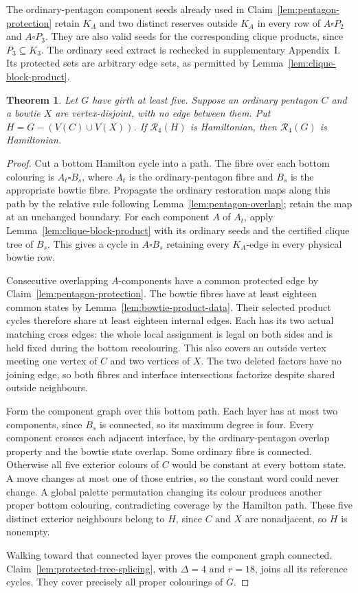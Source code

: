 \documentclass[11pt]{article}
\newtheorem{theorem}{Theorem}[section]
\theoremstyle{remark}
\newcommand{\R}{\mathcal R}
\numberwithin{equation}{section}
\numberwithin{table}{section}
\begin{document}
The ordinary-pentagon component seeds already used in
Claim~\ref{lem:pentagon-protection} retain $K_A$ and two distinct
reserves outside $K_A$ in every row of $A\square P_2$ and
$A\square P_3$. They are also valid seeds for the corresponding
clique products, since $P_3\subseteq K_3$. The ordinary seed extract
is rechecked in supplementary Appendix~I. Its protected sets are
arbitrary edge sets, as permitted by Lemma~\ref{lem:clique-block-product}.

\begin{theorem}\label{thm:pentagon-bowtie-restoration}
Let $G$ have girth at least five. Suppose an ordinary pentagon $C$
and a bowtie $X$ are vertex-disjoint, with no edge between them.
Put $H=G-(V(C)\cup V(X))$. If $\R_4(H)$ is Hamiltonian, then
$\R_4(G)$ is Hamiltonian.
\end{theorem}
\begin{proof}
Cut a bottom Hamilton cycle into a path. The fibre over each bottom
colouring is $A_t\square B_s$, where $A_t$ is the ordinary-pentagon
fibre and $B_s$ is the appropriate bowtie fibre. Propagate the ordinary
restoration maps along this path by the relative rule following
Lemma~\ref{lem:pentagon-overlap}; retain the map at an unchanged boundary.
For each component $A$ of $A_t$, apply
Lemma~\ref{lem:clique-block-product} with its ordinary seeds and the
certified clique tree of $B_s$. This gives a cycle in $A\square B_s$
retaining every $K_A$-edge in every physical bowtie row.

Consecutive overlapping $A$-components have a common protected edge by
Claim~\ref{lem:pentagon-protection}. The bowtie fibres have at least
eighteen common states by Lemma~\ref{lem:bowtie-product-data}. Their
selected product cycles therefore share at least eighteen internal edges.
Each has its two actual matching cross edges: the whole local assignment
is legal on both sides and is held fixed during the bottom recolouring.
This also covers an outside vertex meeting one vertex of $C$ and two
vertices of $X$. The two deleted factors have no joining edge, so both
fibres and interface intersections factorize despite shared outside
neighbours.

Form the component graph over this bottom path. Each layer has at most
two components, since $B_s$ is connected, so its maximum degree is four.
Every component crosses each adjacent interface, by the ordinary-pentagon
overlap property and the bowtie state overlap. Some ordinary fibre is
connected. Otherwise all five exterior colours of $C$ would be constant
at every bottom state. A move changes at most one of those entries, so
the constant word could never change. A global palette permutation
changing its colour produces another proper bottom colouring, contradicting
coverage by the Hamilton path. These five distinct exterior neighbours
belong to $H$, since $C$ and $X$ are nonadjacent, so $H$ is nonempty.

Walking toward that connected layer proves the component graph connected.
Claim~\ref{lem:protected-tree-splicing}, with $\Delta=4$ and $r=18$,
joins all its reference cycles. They cover precisely all proper
colourings of $G$.
\end{proof}
\end{document}
